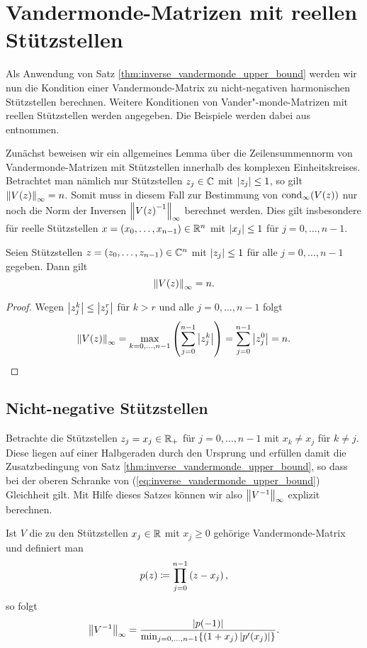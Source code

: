 
\chapter{Vandermonde-Matrizen mit reellen Stützstellen}
Als Anwendung von Satz \ref{thm:inverse_vandermonde_upper_bound} werden wir nun
die Kondition einer Vandermonde-Matrix zu nicht-negativen harmonischen Stützstellen
berechnen.
Weitere Konditionen von Vander"-monde-Matrizen mit reellen Stützstellen werden
angegeben.
Die Beispiele werden dabei aus \cite[S. 197-199]{gautschi1} entnommen.

Zunächst beweisen wir ein allgemeines Lemma über die Zeilensummennorm
von Vandermonde-Matrizen mit Stützstellen innerhalb des komplexen
Einheitskreises.
Betrachtet man nämlich nur Stützstellen $z_j \in \C$ mit $\abs{z_j} \leq 1$,
so gilt $\norm{\Vand{z}}_{\infty} = n$.
Somit muss in diesem Fall zur Bestimmung von $\cond[\infty]{\Vand{z}}$ nur noch die
Norm der Inversen $\norm{\Vand{z}^{-1}}_{\infty}$ berechnet werden.
Dies gilt insbesondere für reelle Stützstellen
$x = (x_0, \dots, x_{n-1}) \in \Rn$ mit $\abs{x_j} \leq 1$ für $j=0, \dots, n-1$.

\begin{lemma}
    \label{lemma:infty_norm_vandermonde_unit_roots}
    Seien Stützstellen $z = (z_0, \dots, z_{n-1}) \in \Cn$
    mit $\abs{z_j} \leq 1$ für alle\linebreak
    $j=0,\dots,n-1$ gegeben.
    Dann gilt
    \begin{equation}
        \label{eq:infty_norm_vandermonde_unit_roots}
        \norm{V(z)}_{\infty} = n.
    \end{equation}
\end{lemma}

\begin{proof}
    Wegen $\abs{z_j^k} \leq \abs{z_j^r}$ für $k > r$ und alle $j = 0, \dots, n-1$ folgt
    \[
        \norm{V(z)}_{\infty}
        = \max_{k=0,\dots,n-1} \left( \sum_{j=0}^{n-1} \abs{z_j^k} \right)
        = \sum_{j=0}^{n-1} \abs{z_j^0}
        = n.
    \]
\end{proof}

\section{Nicht-negative Stützstellen}
Betrachte die Stützstellen $z_j = x_j \in \R_+$ für $j = 0, \dots, n-1$
mit $x_k \neq x_j$ für $k \neq j$.
Diese liegen auf einer Halbgeraden durch den Ursprung und erfüllen damit die
Zusatzbedingung von Satz \ref{thm:inverse_vandermonde_upper_bound},
so dass bei der oberen Schranke von (\ref{eq:inverse_vandermonde_upper_bound})
Gleichheit gilt.
Mit Hilfe dieses Satzes können wir also $\norm{V^{-1}}_\infty$ explizit berechnen.
\begin{lemma}
    \label{lemma:nonnegative_real_nodes}
    Ist $V$ die zu den Stützstellen $x_j \in \R$ mit $x_j \geq 0$ gehörige
    Vandermonde-Matrix und definiert man
    \[
        p(z) \defeq \prod_{j=0}^{n-1} \left( z - x_j \right),
    \]
    so folgt
    \[
        \norm{V^{-1}}_{\infty} = \frac{ \abs{p(-1)}}{\min_{j=0, \dots, n-1} \{ (1+x_j) \abs{p^{\prime}(x_j)} \}}.
    \]
\end{lemma}

